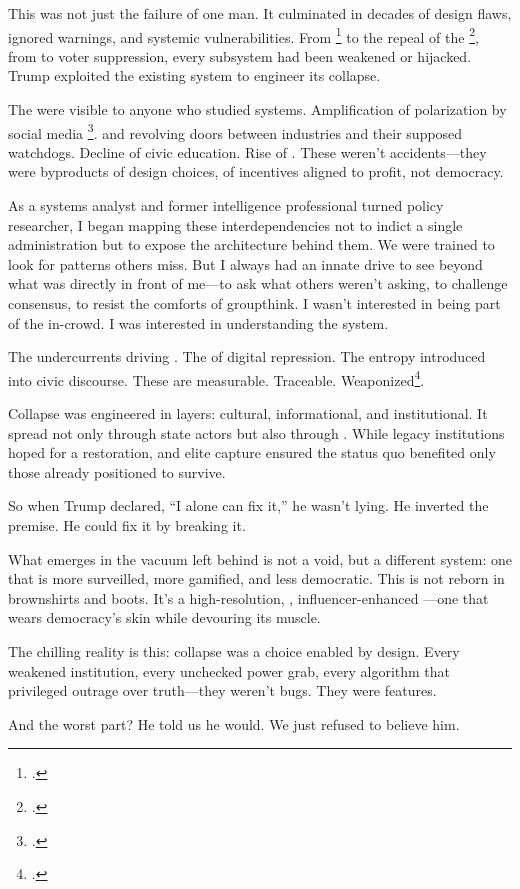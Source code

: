 This was not just the failure of one man. It culminated in decades of design flaws, ignored warnings, and systemic vulnerabilities. From \footcite{citizensunitedvfec2010} to the repeal of the \footcite{pickard2019fight}, from  to voter suppression, every subsystem had been weakened or hijacked. Trump exploited the existing system to engineer its collapse.

The  were visible to anyone who studied systems. Amplification of polarization by social media \footcite{tufekci2015algorithmic}.  and revolving doors between industries and their supposed watchdogs. Decline of civic education. Rise of . These weren’t accidents—they were byproducts of design choices, of incentives aligned to profit, not democracy.

As a systems analyst and former intelligence professional turned policy researcher, I began mapping these interdependencies not to indict a single administration but to expose the architecture behind them. We were trained to look for patterns others miss. But I always had an innate drive to see beyond what was directly in front of me—to ask what others weren’t asking, to challenge consensus, to resist the comforts of groupthink. I wasn’t interested in being part of the in-crowd. I was interested in understanding the system.

The  undercurrents driving . The  of digital repression. The entropy introduced into civic discourse. These are measurable. Traceable. Weaponized\footcite{zuboff2019age}.

Collapse was engineered in layers: cultural, informational, and institutional. It spread not only through state actors but also through . While legacy institutions hoped for a restoration,  and elite capture ensured the status quo benefited only those already positioned to survive.

So when Trump declared, “I alone can fix it,” he wasn’t lying. He inverted the premise. He could fix it by breaking it.

What emerges in the vacuum left behind is not a void, but a different system: one that is more surveilled, more gamified, and less democratic. This is not  reborn in brownshirts and boots. It’s a high-resolution, , influencer-enhanced —one that wears democracy’s skin while devouring its muscle.

The chilling reality is this: collapse was a choice enabled by design. Every weakened institution, every unchecked power grab, every algorithm that privileged outrage over truth—they weren’t bugs. They were features.

And the worst part? He told us he would. We just refused to believe him.

\printbibliography

